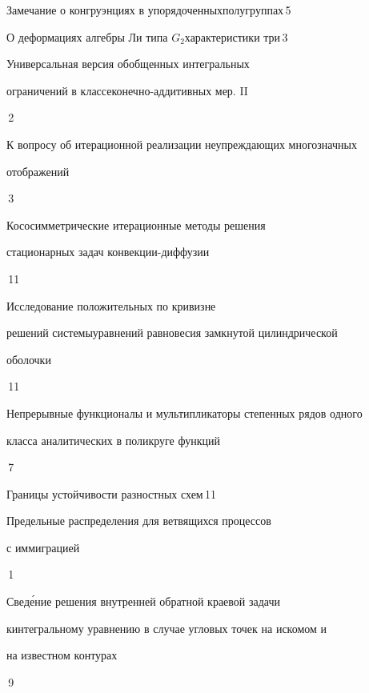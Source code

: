 

{Замечание о конгруэнциях в упорядоченных\newline полугруппах}{\No\,5}




{О деформациях алгебры Ли типа $G_{2}$\newline характеристики три}{\No\,3}




{Универсальная версия обобщенных интегральных


ограничений в классе\newline конечно-аддитивных мер. II}{\No\,2}




{К вопросу об итерационной реализации неупреждающих многозначных\newline


отображений}{\No\,3}




{Кососимметрические итерационные методы решения\newline


стационарных задач конвекции-диффузии}{\No\,11}




{Исследование положительных по кривизне


решений системы\newline уравнений равновесия замкнутой цилиндрической


оболочки}{\No\,11}




{Непрерывные функционалы и мультипликаторы степенных рядов одного \newline


класса аналитических в поликруге функций}{\No\,7}




{Границы устойчивости разностных схем}{\No\,11}




{Предельные распределения для ветвящихся процессов


с иммиграцией}{\No\,1}




{Свед\'ение решения внутренней обратной краевой задачи


к\newline интегральному уравнению в случае угловых точек на искомом и


на известном контурах}{\No\,9}


